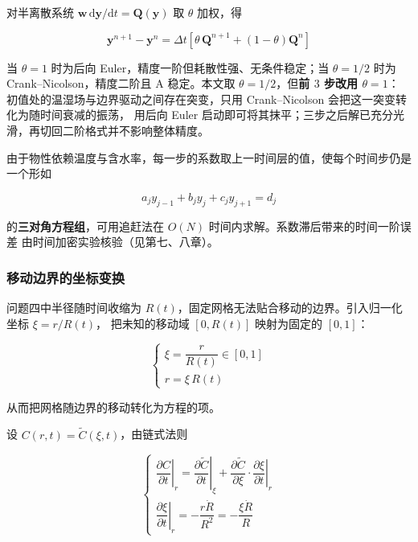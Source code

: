 
对半离散系统 $\mathbf{w}\,\mathrm{d}\mathbf{y}/\mathrm{d}t=\mathbf{Q}(\mathbf{y})$ 取 $\theta$ 加权，得

\begin{equation}
\mathbf{y}^{n+1}-\mathbf{y}^{n}
=\Delta t\left[\theta\,\mathbf{Q}^{n+1}+(1-\theta)\mathbf{Q}^{n}\right]
\label{eq:theta}
\end{equation}


当 $\theta=1$ 时为后向 Euler，精度一阶但耗散性强、无条件稳定；当 $\theta=1/2$ 时为
Crank--Nicolson，精度二阶且 A 稳定。本文取 $\theta=1/2$，但\textbf{前 $3$ 步改用 $\theta=1$}：
初值处的温湿场与边界驱动之间存在突变，只用 Crank--Nicolson 会把这一突变转化为随时间衰减的振荡，
用后向 Euler 启动即可将其抹平；三步之后解已充分光滑，再切回二阶格式并不影响整体精度。


由于物性依赖温度与含水率，每一步的系数取上一时间层的值，使每个时间步仍是一个形如

\begin{equation}
a_jy_{j-1}+b_jy_j+c_jy_{j+1}=d_j
\label{eq:tridiag}
\end{equation}

的\textbf{三对角方程组}，可用追赶法在 $O(N)$ 时间内求解。系数滞后带来的时间一阶误差
由时间加密实验核验（见第七、八章）。

\subsubsection{移动边界的坐标变换}


问题四中半径随时间收缩为 $R(t)$，固定网格无法贴合移动的边界。引入归一化坐标 $\xi=r/R(t)$，
把未知的移动域 $[0,R(t)]$ 映射为固定的 $[0,1]$：

\begin{equation}
\begin{cases}
\xi=\dfrac{r}{R(t)}\in[0,1]\\[16pt]
r=\xi\,R(t)
\end{cases}
\label{eq:xi}
\end{equation}

从而把网格随边界的移动转化为方程的项。


设 $C(r,t)=\tilde C(\xi,t)$，由链式法则

\begin{equation}
\begin{cases}
\left.\dfrac{\partial C}{\partial t}\right|_r
=\left.\dfrac{\partial \tilde C}{\partial t}\right|_\xi
+\dfrac{\partial \tilde C}{\partial \xi}\cdot\left.\dfrac{\partial \xi}{\partial t}\right|_r\\[16pt]
\left.\dfrac{\partial \xi}{\partial t}\right|_r
=-\dfrac{r\dot R}{R^2}=-\dfrac{\xi\dot R}{R}
\end{cases}
\label{eq:chain}
\end{equation}

